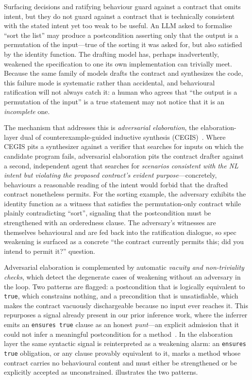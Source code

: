 Surfacing decisions and ratifying behaviour guard against a contract that omits intent, but they do not guard against a contract that is technically consistent with the stated intent yet too weak to be useful. An LLM asked to formalise ``sort the list'' may produce a postcondition asserting only that the output is a permutation of the input---true of the sorting it was asked for, but also satisfied by the identity function. The drafting model has, perhaps inadvertently, weakened the specification to one its own implementation can trivially meet. Because the same family of models drafts the contract and synthesizes the code, this failure mode is systematic rather than accidental, and behavioural ratification will not always catch it: a human who agrees that ``the output is a permutation of the input'' is a true statement may not notice that it is an \emph{incomplete} one.

The mechanism that addresses this is \emph{adversarial elaboration}, the elaboration-layer dual of counterexample-guided inductive synthesis (CEGIS)~\cite{solarlezama2008sketching}. Where CEGIS pits a synthesizer against a verifier that searches for inputs on which the candidate program fails, adversarial elaboration pits the contract drafter against a second, independent agent that searches for \emph{scenarios consistent with the NL intent but violating the proposed contract's evident purpose}---concretely, behaviours a reasonable reading of the intent would forbid that the drafted contract nonetheless permits. For the sorting example, the adversary exhibits the identity function as a witness that satisfies the permutation-only contract while plainly contradicting ``sort'', signaling that the postcondition must be strengthened with an orderedness clause. The adversary's witnesses are themselves behavioural and are fed back into the ratification dialogue, so spec weakening is surfaced as a concrete ``the contract currently permits this; did you intend to permit it?'' question.

Adversarial elaboration is complemented by automatic \emph{vacuity and non-triviality checks}, which detect the degenerate cases of weakening without an adversary in the loop. Two patterns are flagged: a postcondition that is logically equivalent to \lstinline|true|, which constrains nothing, and a precondition that is unsatisfiable, which makes the contract vacuously dischargeable because no input ever reaches it. This repurposes a signal already present in our prior inference work, where the inferrer emits an \lstinline|ensures true| clause as an honest \emph{punt}---an explicit admission that it could not infer a meaningful postcondition for a method~\cite{edmonds_article1}. In the elaboration layer the same syntactic signal is reinterpreted as a weakening alarm: an \lstinline|ensures true| obligation, or any clause provably equivalent to it, marks a method whose contract carries no behavioural content and must either be strengthened or be explicitly accepted as unconstrained.  illustrates the two patterns.

